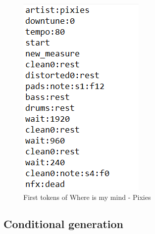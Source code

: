 \documentclass[11pt, a4paper]{article}
\begin{document}
\begin{figure}[h!]
    \centering
    \includegraphics[width=.5\linewidth]{figs/dadagp_tokenization_pixies_wimm.png}
    \caption{First tokens of Where is my mind - Pixies}
    \label{fig:dadagp_tokenization}
\end{figure}





\subsection*{Conditional generation}




\newpage

\printbibliography%
\end{document}
